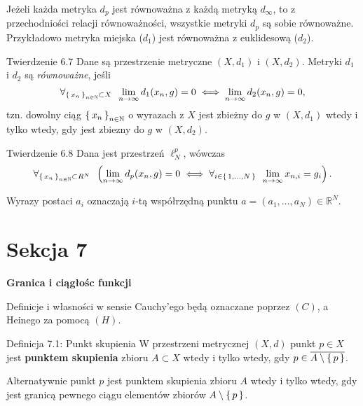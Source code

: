 \documentclass{article}
\newcommand{\hquad}{\mkern9mu}
\newcommand{\R}{\mathbb{R}}
\newcommand{\N}{\mathbb{N}}
\newcommand{\lin}[1]{\lim\limits_{n\to\infty}{#1}}
\newcommand*\closure[1]{\overline{#1}}
\newcommand{\seq}[1]{\set{#1_n}_{n\in\N}}
\begin{document}
Jeżeli każda metryka $d_p$ jest równoważna z każdą metryką $d_\infty$, to z przechodniości relacji równoważności,
wszystkie metryki $d_p$ są sobie równoważne. Przykładowo metryka miejska ($d_1$) jest równoważna z euklidesową ($d_2$). 

\begin{twier}{Twierdzenie 6.7}
    Dane są przestrzenie metryczne $(X,d_1)$ i $(X,d_2)$. Metryki $d_1$ i $d_2$ są \textit{równoważne}, jeśli
    \begin{equation*}
        \forall_{\seq{x}\subset X}\hquad \lin{d_1(x_n,g)}=0\iff \lin{d_2(x_n,g)}=0,
    \end{equation*}
    tzn. dowolny ciąg $\seq{x}$ o wyrazach z $X$ jest zbieżny do $g$ w $(X,d_1)$ wtedy i tylko wtedy, gdy jest zbiezny do
    $g$ w $(X,d_2)$.
\end{twier}

\begin{twier}{Twierdzenie 6.8}
    Dana jest przestrzeń $\ell^p_N$, wówczas
    \begin{equation*}
        \forall_{\seq{x}\subset R^N}\hquad \left(\lin{d_p(x_n,g)=0}\iff\forall_{i\in\set{1,\dots,N}}\hquad\lin{x_{n,i}=g_i}\right).
    \end{equation*} 
\end{twier}

Wyrazy postaci $a_i$ oznaczają $i$-tą współrzędną punktu $a=(a_1,\dots,a_N)\in\R^N$.
\newpage


                                \section*{Sekcja 7} \smallskip
                                {\Huge\bfseries Granica i ciągłośc funkcji} \bigskip \medskip

Definicje i własności w sensie Cauchy'ego będą oznaczane poprzez $(C)$, a Heinego za pomocą $(H)$.

\begin{defr}{Definicja 7.1: Punkt skupienia}
    W przestrzeni metrycznej $(X,d)$ punkt $p\in X$ jest \textbf{punktem skupienia} zbioru $A\subset X$ wtedy i tylko wtedy,
    gdy $p\in\closure{A\setminus\set{p}}$.\smallskip

    Alternatywnie punkt $p$ jest punktem skupienia zbioru $A$ wtedy i tylko wtedy, gdy 
    jest granicą pewnego ciągu elementów zbiorów $A\setminus\set{p}$.
\end{defr}
\end{document}

